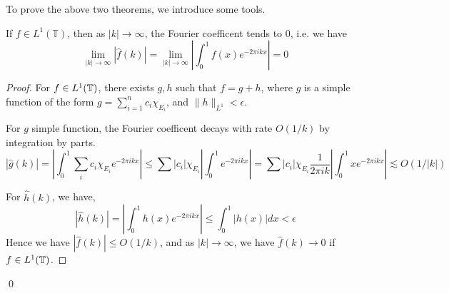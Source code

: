To prove the above two theorems, we introduce some tools.
\begin{lemma}
    If $f\in L^1(\mathbb{T})$, then as $|k|\to\infty$, the Fourier coefficent tends to 0, i.e. we have
    \begin{equation*}
        \lim_{|k|\to\infty}|\hat{f}(k)|=\lim_{|k|\to\infty}\left|\int_0^1f(x)e^{-2\pi ikx} \right|=0
    \end{equation*}
\end{lemma}
\begin{proof}
    For $f\in L^1(\mathbb{T})$, there exists $g,h$ such that $f=g+h$, where $g$ is a simple function of the form $g=\sum_{i=1}^nc_i\chi_{E_i}$, and $\|h\|_{L^1}<\epsilon$.

    For $g$ simple function, the Fourier coefficent decays with rate $O(1/k)$ by integration by parts.
    \begin{equation*}
        |\hat{g}(k)|=\left|\int_0^1\sum_ic_i\chi_{E_i}e^{-2\pi ikx}\right|\leq\sum|c_i|\chi_{E_i}\left|\int_0^1e^{-2\pi ikx} \right|=\sum|c_i|\chi_{E_i}\frac{1}{2\pi ik}\left|\int_0^1xe^{-2\pi ikx} \right|\lesssim O(1/|k|)
    \end{equation*}

    For $\hat{h}(k)$, we have,
    \begin{equation*}
        \left|\hat{h}(k)\right|=\left|\int_0^1h(x)e^{-2\pi ikx}\right|\leq\int_0^1|h(x)|dx<\epsilon
    \end{equation*}
    Hence we have $|\hat{f}(k)|\leq O(1/k)$, and as $|k|\to\infty$, we have $\hat{f}(k)\to 0$ if $f\in L^1(\mathbb{T})$.
\end{proof}
\qed

